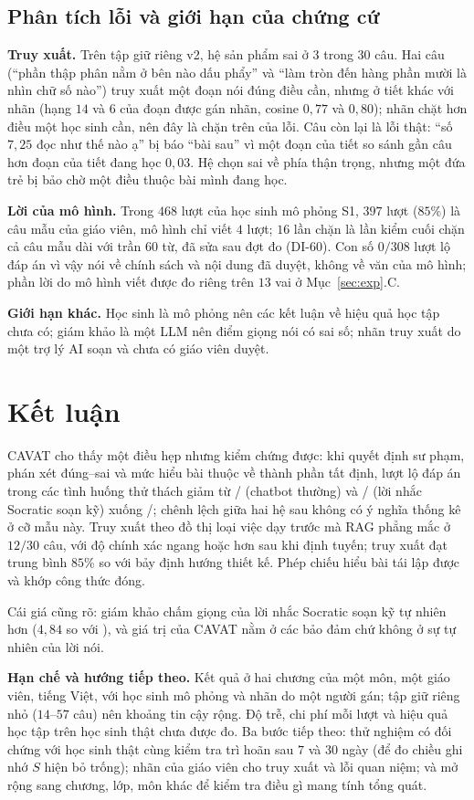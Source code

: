 \documentclass[10pt,a4paper,twocolumn]{article}
\begin{document}
\subsection{Phân tích lỗi và giới hạn của chứng cứ}
\textbf{Truy xuất.} Trên tập giữ riêng v2, hệ sản phẩm sai ở $3$ trong $30$ câu. Hai câu (``phần thập phân nằm ở bên nào dấu phẩy'' và ``làm tròn đến hàng phần mười là nhìn chữ số nào'') truy xuất một đoạn nói đúng điều cần, nhưng ở tiết khác với nhãn (hạng $14$ và $6$ của đoạn được gán nhãn, cosine $0{,}77$ và $0{,}80$); nhãn chặt hơn điều một học sinh cần, nên đây là chặn trên của lỗi. Câu còn lại là lỗi thật: ``số $7{,}25$ đọc như thế nào ạ'' bị báo ``bài sau'' vì một đoạn của tiết so sánh gần câu hơn đoạn của tiết đang học $0{,}03$. Hệ chọn sai về phía thận trọng, nhưng một đứa trẻ bị bảo chờ một điều thuộc bài mình đang học.

\textbf{Lời của mô hình.} Trong $468$ lượt của học sinh mô phỏng S1, $397$ lượt ($85\%$) là câu mẫu của giáo viên, mô hình chỉ viết $4$ lượt; $16$ lần chặn là lần kiểm cuối chặn cả câu mẫu dài với trần $60$ từ, đã sửa sau đợt đo (DI-60). Con số $0/308$ lượt lộ đáp án vì vậy nói về chính sách và nội dung đã duyệt, không về văn của mô hình; phần lời do mô hình viết được đo riêng trên $13$ vai ở Mục~\ref{sec:exp}.C.

\textbf{Giới hạn khác.} Học sinh là mô phỏng nên các kết luận về hiệu quả học tập chưa có; giám khảo là một LLM nên điểm giọng nói có sai số; nhãn truy xuất do một trợ lý AI soạn và chưa có giáo viên duyệt.

\section{Kết luận}\label{sec:conclusion}
CAVAT cho thấy một điều hẹp nhưng kiểm chứng được: khi quyết định sư phạm, phán xét đúng--sai và mức hiểu bài thuộc về thành phần tất định, lượt lộ đáp án trong các tình huống thử thách giảm từ \BoneLeaks{}/\BoneTurns{} (chatbot thường) và \BtwoLeaks{}/\BtwoTurns{} (lời nhắc Socratic soạn kỹ) xuống \CavLeaks{}/\CavTurns{}; chênh lệch giữa hai hệ sau không có ý nghĩa thống kê ở cỡ mẫu này. Truy xuất theo đồ thị loại việc dạy trước mà RAG phẳng mắc ở $12/30$ câu, với độ chính xác ngang hoặc hơn sau khi định tuyến; truy xuất đạt trung bình $85\%$ so với bảy định hướng thiết kế. Phép chiếu hiểu bài tái lập được và khớp công thức đóng.

Cái giá cũng rõ: giám khảo chấm giọng của lời nhắc Socratic soạn kỹ tự nhiên hơn ($4{,}84$ so với \CavSocratic{}), và giá trị của CAVAT nằm ở các bảo đảm chứ không ở sự tự nhiên của lời nói.

\textbf{Hạn chế và hướng tiếp theo.} Kết quả ở hai chương của một môn, một giáo viên, tiếng Việt, với học sinh mô phỏng và nhãn do một người gán; tập giữ riêng nhỏ ($14$--$57$ câu) nên khoảng tin cậy rộng. Độ trễ, chi phí mỗi lượt và hiệu quả học tập trên học sinh thật chưa được đo. Ba bước tiếp theo: thử nghiệm có đối chứng với học sinh thật cùng kiểm tra trì hoãn sau $7$ và $30$ ngày (để đo chiều ghi nhớ $S$ hiện bỏ trống); nhãn của giáo viên cho truy xuất và lỗi quan niệm; và mở rộng sang chương, lớp, môn khác để kiểm tra điều gì mang tính tổng quát.


\end{document}
